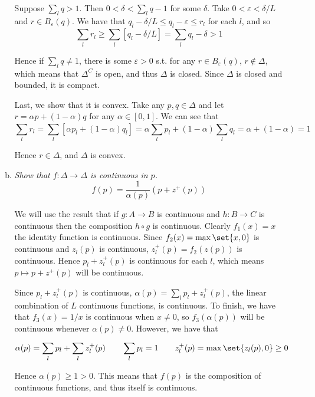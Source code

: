\documentclass{article}
\begin{document}
\begin{enumerate}[1.]
\begin{enumerate}[a)]
        Suppose $\sum^{}_{l} q > 1$. Then $0 < \delta < \sum^{}_{l} q - 1$ for some $\delta$. Take $0 < \varepsilon < \delta / L$ and $r \in B_{\varepsilon}(q)$. We have that $q_l - \delta / L \le q_l - \varepsilon \le r_l$ for each $l$, and so
        \[
          \sum^{}_{l} r_l \ge \sum^{}_{l}  \left[q_l - \delta / L\right] = \sum^{}_{l} q_l - \delta > 1
        \]

        Hence if $\sum^{}_{l} q \ne 1$, there is some $\varepsilon > 0$ s.t. for any $r \in B_{\varepsilon}(q)$, $r \notin \Delta$, which means that $\Delta^C$ is open, and thus $\Delta$ is closed. Since $\Delta$ is closed and bounded, it is compact.

        Last, we show that it is convex. Take any $p, q \in \Delta$ and let $r = \alpha p + (1 - \alpha) q$ for any $\alpha \in [0, 1]$. We can see that
        \[
          \sum^{}_{l} r_l
          = \sum^{}_{l} \left[\alpha p_l + (1 - \alpha) q_l\right]
          = \alpha \sum^{}_{l} p_l + (1 - \alpha) \sum^{}_{l} q_l
          = \alpha + (1 - \alpha)
          = 1
        \]

        Hence $r \in \Delta$, and $\Delta$ is convex.

      \item \textit{Show that $f: \Delta \to \Delta$ is continuous in $p$.}
        \[
          f(p) = \dfrac{1}{\alpha(p)} \left(p + z^+(p)\right)
        \]

        \solution We will use the result that if $g: A \to B$ is continuous and $h: B \to C$ is continuous then the composition $h \circ g$ is continuous. Clearly $f_1(x) = x$ the identity function is continuous. Since $f_2(x) = \max\set{x, 0}$ is continuous and $z_l(p)$ is continuous, $z_l^+(p) = f_2(z(p))$ is continuous. Hence $p_l + z_l^+(p)$ is continuous for each $l$, which means $p \mapsto p + z^+(p)$ will be continuous.

        Since $p_l + z_l^+(p)$ is continuous, $\alpha(p) = \sum^{}_{l} p_l + z_l^+(p)$, the linear combination of $L$ continuous functions, is continuous. To finish, we have that $f_3(x) = 1 / x$ is continuous when $x \ne 0$, so $f_3(\alpha(p))$ will be continuous whenever $\alpha(p) \ne 0$. However, we have that
        \[
          \alpha(p) = \sum^{}_{l} p_l + \sum^{}_{l} z^+_l(p)
          \quad\quad
          \sum^{}_{l} p_l = 1
          \quad\quad
          z^+_l(p) = \max\set{z_l(p), 0} \ge 0
        \]

        Hence $\alpha(p) \ge 1 > 0$. This means that $f(p)$ is the composition of continuous functions, and thus itself is continuous.


\end{enumerate}
\end{enumerate}
\end{document}
